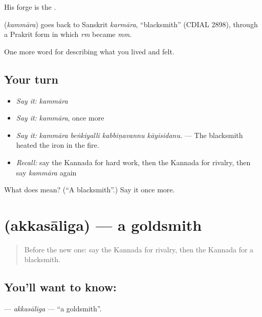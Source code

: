 His forge is the .

\begin{cousinweb}
\textbf{} (\emph{kammāra}) goes back to Sanskrit \emph{karmāra}, \textquotedblleft{}blacksmith\textquotedblright{} (CDIAL 2898), through a Prakrit form in which \emph{rm} became \emph{mm}.
\end{cousinweb}

\begin{grammarlens}[title={What you've built}]
One more word for describing what you lived and felt.
\end{grammarlens}

\subsection*{Your turn}
\begin{itemize}
\raggedright
  \item \emph{Say it:} \emph{kammāra}
  \item \emph{Say it:} \emph{kammāra}, once more
  \item \emph{Say it:} \emph{kammāra beṅkiyalli kabbiṇavannu kāyisidanu.} — The blacksmith heated the iron in the fire.
  \item \emph{Recall:} say the Kannada for hard work, then the Kannada for rivalry, then say \emph{kammāra} again
\end{itemize}

\begin{tcolorbox}[breakable,colback=teal!4,colframe=teal!35!black,title={Before you move on}]
What does  mean? (\textquotedblleft{}A blacksmith\textquotedblright{}.) Say it once more.
\end{tcolorbox}
\section[\texorpdfstring{\kn{ಅಕ್ಕಸಾಲಿಗ} (akkasāliga)}{ಅಕ್ಕಸಾಲಿಗ (akkasāliga)}]{ (akkasāliga) — a goldsmith}

\label{lesson:KA-C522-akkasaliga}



\begin{quote}
Before the new one: say the Kannada for rivalry, then the Kannada for a blacksmith.
\end{quote}

\subsection*{You'll want to know: }
\textbf{} — \emph{akkasāliga} — \textquotedblleft{}a goldsmith\textquotedblright{}.

